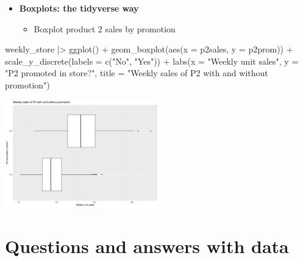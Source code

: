 \documentclass[
  ignorenonframetext,
]{beamer}
\newenvironment{Shaded}{\begin{snugshade}}{\end{snugshade}}
\newcommand{\AttributeTok}[1]{\textcolor[rgb]{0.40,0.45,0.13}{#1}}
\newcommand{\FunctionTok}[1]{\textcolor[rgb]{0.28,0.35,0.67}{#1}}
\newcommand{\NormalTok}[1]{\textcolor[rgb]{0.00,0.23,0.31}{#1}}
\newcommand{\SpecialCharTok}[1]{\textcolor[rgb]{0.37,0.37,0.37}{#1}}
\newcommand{\StringTok}[1]{\textcolor[rgb]{0.13,0.47,0.30}{#1}}
\providecommand{\tightlist}{%
  \setlength{\itemsep}{0pt}\setlength{\parskip}{0pt}}\usepackage{longtable,booktabs,array}
\begin{document}
\begin{frame}[fragile]{}
\label{section-27}
\begin{itemize}
\item
  \textbf{Boxplots: the tidyverse way}

  \begin{itemize}
  \tightlist
  \item
    Boxplot product 2 sales by promotion
  \end{itemize}
\end{itemize}

\tiny

\begin{Shaded}
\begin{Highlighting}[]
\NormalTok{weekly\_store }\SpecialCharTok{|\textgreater{}} \FunctionTok{ggplot}\NormalTok{() }\SpecialCharTok{+} 
  \FunctionTok{geom\_boxplot}\NormalTok{(}\FunctionTok{aes}\NormalTok{(}\AttributeTok{x =}\NormalTok{ p2sales, }\AttributeTok{y =}\NormalTok{ p2prom)) }\SpecialCharTok{+} 
  \FunctionTok{scale\_y\_discrete}\NormalTok{(}\AttributeTok{labels =} \FunctionTok{c}\NormalTok{(}\StringTok{"No"}\NormalTok{, }\StringTok{"Yes"}\NormalTok{)) }\SpecialCharTok{+}
  \FunctionTok{labs}\NormalTok{(}\AttributeTok{x =} \StringTok{"Weekly unit sales"}\NormalTok{, }\AttributeTok{y =} \StringTok{"P2 promoted in store?"}\NormalTok{, }
       \AttributeTok{title =} \StringTok{"Weekly sales of P2 with and without promotion"}\NormalTok{)}
\end{Highlighting}
\end{Shaded}

\begin{center}
\includegraphics[width=0.5\textwidth,height=\textheight]{003_describing_data_files/figure-beamer/unnamed-chunk-26-1.pdf}
\end{center}
\end{frame}

\section{Questions and answers with
data}\label{questions-and-answers-with-data}
\end{document}
